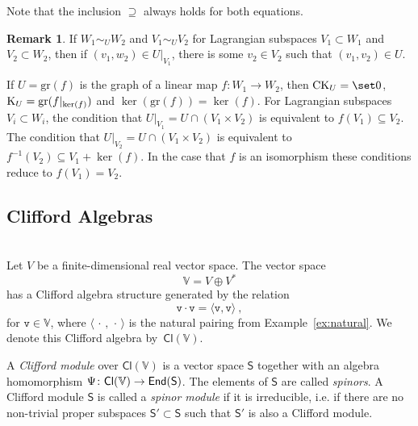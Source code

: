 \documentclass[a4paper, reqno, 11pt]{amsart}
\numberwithin{equation}{section}
\theoremstyle{definition}
\newtheorem{remark}[equation]{Remark}
\newcommand{\ip}[1]{\langle #1 \rangle}
\newcommand{\IV}{\mathbb{V}}
\newcommand{\Cl}{\mathsf{Cl}}
\newcommand{\sfS}{{\mathsf{S}}}
\newcommand{\gr}{\text{gr}}
\theoremstyle{remark}
\begin{document}
Note that the inclusion $\supseteq$ always holds for both equations. 

\begin{remark}
    If $W_1 \sim_U W_2$ and $V_1 \sim_U V_2$ for Lagrangian subspaces $V_1 \subset W_1$ and $V_2 \subset W_2$, then if $(v_1, w_2) \in U\rvert_{V_1}$, there is some $v_2 \in V_2$ such that $(v_1,v_2) \in U$.

    If $U = \gr(f)$ is the graph of a linear map $f\colon W_1 \to W_2$, then ${\rm CK}_U = \set 0$, ${\rm K}_U = \gr(f\rvert_{\ker(f)})$ and $\ker(\gr(f)) = \ker(f)$. For Lagrangian subspaces $V_i \subset W_i$, the condition that $U\rvert_{V_1} = U\cap (V_1 \times V_2)$ is equivalent to $f(V_1) \subseteq V_2$. The condition that $U\rvert_{V_2} = U \cap (V_1 \times V_2)$ is equivalent to $f^{-1}(V_2) \subseteq V_1 + \ker(f)$. In the case that $f$ is an isomorphism these conditions reduce to $f(V_1) = V_2$.
\end{remark}

\medskip

\subsection{Clifford Algebras}~\\[5pt]
\label{sub:Clifford_alg}
Let $V$ be a finite-dimensional real vector space. The vector space $$\IV = V\oplus V^*$$ has a Clifford algebra structure generated by the relation $$\texttt{v} \cdot \texttt{v} = \ip{\texttt{v},\texttt{v}} \ , $$ for $\texttt{v}\in \IV$, where $\ip{\,\cdot\,,\,\cdot\,}$ is the natural pairing from Example~\ref{ex:natural}. We denote this Clifford algebra by~$\Cl(\IV)$. 

A \emph{Clifford module} over $\Cl(\IV)$ is a vector space $\sfS$ together with an algebra homomorphism $\Psi \colon \Cl(\IV) \to {\sf End}(\sfS)$. The elements of $\sfS$ are called \emph{spinors}. A Clifford module $\sfS$ is called a \emph{spinor module} if it is irreducible, i.e. if there are no non-trivial proper subspaces $\sfS' \subset \sfS$ such that $\sfS'$ is also a Clifford module. 
\end{document}
